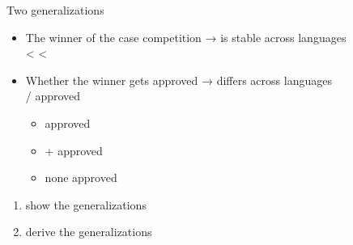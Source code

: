 \documentclass[xcolor=dvipsnames,10pt]{beamer}
\begin{document}
\begin{frame}{Two generalizations}
\pause

\begin{itemize}
  \item The winner of the case competition → is stable across languages\\ \pause
   <  < \pause
  \item Whether the winner gets approved → differs across languages\\ \pause
  / approved\pause
  \begin{itemize}
    \item {} approved
    \item {} +  approved
    \item none approved
  \end{itemize}
\end{itemize}\pause

\vspace{1em}

\begin{enumerate}
  \item show the generalizations\pause
  \item derive the generalizations
\end{enumerate}

\end{frame}
\end{document}
